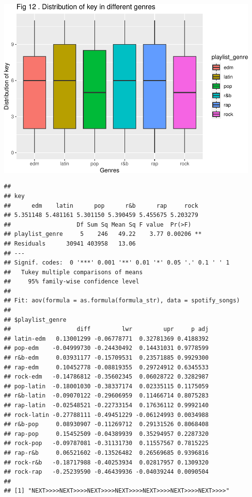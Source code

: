 \documentclass[
]{article}
\begin{document}
\includegraphics{Final-Report_files/figure-latex/unnamed-chunk-14-8.pdf}

\begin{verbatim}
## 
## key
##      edm    latin      pop      r&b      rap     rock 
## 5.351148 5.481161 5.301150 5.390459 5.455675 5.203279 
##                   Df Sum Sq Mean Sq F value  Pr(>F)   
## playlist_genre     5    246   49.22    3.77 0.00206 **
## Residuals      30941 403958   13.06                   
## ---
## Signif. codes:  0 '***' 0.001 '**' 0.01 '*' 0.05 '.' 0.1 ' ' 1
##   Tukey multiple comparisons of means
##     95% family-wise confidence level
## 
## Fit: aov(formula = as.formula(formula_str), data = spotify_songs)
## 
## $playlist_genre
##                   diff         lwr         upr     p adj
## latin-edm   0.13001299 -0.06778771  0.32781369 0.4188392
## pop-edm    -0.04999730 -0.24430492  0.14431031 0.9778599
## r&b-edm     0.03931177 -0.15709531  0.23571885 0.9929300
## rap-edm     0.10452778 -0.08819355  0.29724912 0.6345533
## rock-edm   -0.14786812 -0.35602345  0.06028722 0.3282987
## pop-latin  -0.18001030 -0.38337174  0.02335115 0.1175059
## r&b-latin  -0.09070122 -0.29606959  0.11466714 0.8075283
## rap-latin  -0.02548521 -0.22733154  0.17636112 0.9992140
## rock-latin -0.27788111 -0.49451229 -0.06124993 0.0034988
## r&b-pop     0.08930907 -0.11269712  0.29131526 0.8068408
## rap-pop     0.15452509 -0.04389939  0.35294957 0.2287320
## rock-pop   -0.09787081 -0.31131730  0.11557567 0.7815225
## rap-r&b     0.06521602 -0.13526482  0.26569685 0.9396816
## rock-r&b   -0.18717988 -0.40253934  0.02817957 0.1309320
## rock-rap   -0.25239590 -0.46439936 -0.04039244 0.0090504
## 
## [1] "NEXT>>>>NEXT>>>>NEXT>>>>NEXT>>>>NEXT>>>>NEXT>>>>NEXT>>>>"
\end{verbatim}
\end{document}
